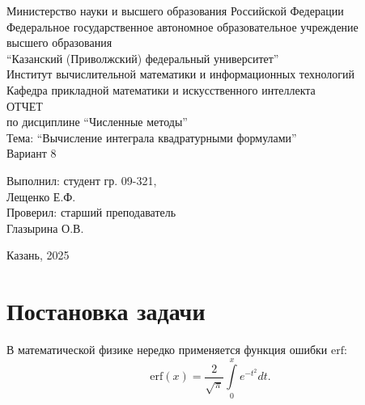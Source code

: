 \documentclass[a4paper, 14pt]{extarticle}
\begin{document}
    \begin{titlepage}
        \begin{center}
            Министерство науки и высшего образования Российской Федерации \\
            Федеральное государственное автономное образовательное учреждение \\
            высшего образования \\
            \enquote{Казанский (Приволжский) федеральный университет} \\
            Институт вычислительной математики и информационных технологий \\
            Кафедра прикладной математики и искусственного интеллекта \\
            \vspace{5 cm}
            ОТЧЕТ \\
            по дисциплине \enquote{Численные методы} \\
            Тема: \enquote{Вычисление интеграла квадратурными формулами} \\
            Вариант 8 \\
            \vspace{3 cm}
        \end{center}
        \begin{flushright}
            Выполнил: студент гр. 09-321, \\
            Лещенко Е.Ф. \\
            Проверил: старший преподаватель \\
            Глазырина О.В. \\
        \end{flushright}
        \vfill
        \begin{center}
            Казань, 2025
        \end{center}
    \end{titlepage}

    \setcounter{page}{2}
    \tableofcontents
    \newpage


    \section{Постановка задачи}\label{sec:-2}
    В математической физике нередко применяется функция ошибки $\mathrm{erf}$:
    \begin{equation}
        \label{eq:definition_erf} \mathrm{erf}(x) = \frac{2}{\sqrt{\pi}} \int\limits_0^x e^{-t^2}dt.
    \end{equation}
\end{document}
